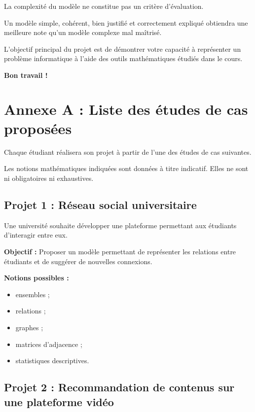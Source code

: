 \documentclass[12pt,a4paper]{article}
\begin{document}
La complexité du modèle ne constitue pas un critère d'évaluation.

Un modèle simple, cohérent, bien justifié et correctement expliqué obtiendra une meilleure note qu'un modèle complexe mal maîtrisé.

L'objectif principal du projet est de démontrer votre capacité à représenter un problème informatique à l'aide des outils mathématiques étudiés dans le cours.

\vspace{1cm}

\begin{center}
\textbf{Bon travail !}
\end{center}

\newpage

\appendix

\section*{Annexe A : Liste des études de cas proposées}

Chaque étudiant réalisera son projet à partir de l'une des études de cas suivantes.

Les notions mathématiques indiquées sont données à titre indicatif. Elles ne sont ni obligatoires ni exhaustives.

\bigskip

\subsection*{Projet 1 : Réseau social universitaire}

Une université souhaite développer une plateforme permettant aux étudiants d'interagir entre eux.

\textbf{Objectif :}
Proposer un modèle permettant de représenter les relations entre étudiants et de suggérer de nouvelles connexions.

\textbf{Notions possibles :}

\begin{itemize}
\item ensembles ;
\item relations ;
\item graphes ;
\item matrices d'adjacence ;
\item statistiques descriptives.
\end{itemize}

\bigskip

\subsection*{Projet 2 : Recommandation de contenus sur une plateforme vidéo}
\end{document}
